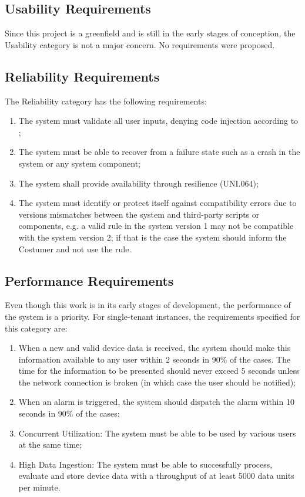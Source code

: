 \subsection{Usability Requirements}
\label{subsec:requirements:non_functional:usability}

Since this project is a greenfield and is still in the early stages of conception, the Usability category is not a major concern. No requirements were proposed.

\subsection{Reliability Requirements}
\label{subsec:requirements:non_functional:reliability}

The Reliability category has the following requirements:

\begin{enumerate}
    \item The system must validate all user inputs, denying code injection according to \cite{top10};
    \item The system must be able to recover from a failure state such as a crash in the system or any system component;
    \item The system shall provide availability through resilience (UNI.064);
    \item The system must identify or protect itself against compatibility errors due to versions mismatches between the system and third-party scripts or components, e.g. a valid rule in the system version 1 may not be compatible with the system version 2; if that is the case the system should inform the Costumer and not use the rule.
\end{enumerate}

\subsection{Performance Requirements}
\label{subsec:requirements:non_functional:performance}

Even though this work is in its early stages of development, the performance of the system is a priority. For single-tenant instances, the requirements specified for this category are:

\begin{enumerate}
    \item When a new and valid device data is received, the system should make this information available to any user within 2 seconds in 90\% of the cases. The time for the information to be presented should never exceed 5 seconds unless the network connection is broken (in which case the user should be notified);
    \item When an alarm is triggered, the system should dispatch the alarm within 10 seconds in 90\% of the cases;
    \item Concurrent Utilization: The system must be able to be used by various users at the same time;
    \item High Data Ingestion: The system must be able to successfully process, evaluate and store device data with a throughput of at least 5000 data units per minute.
\end{enumerate}


